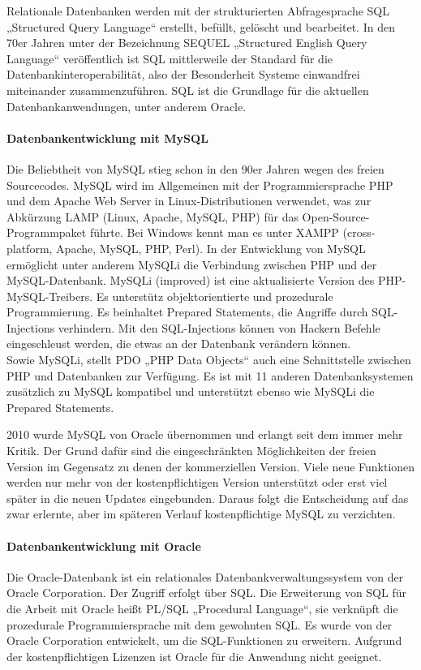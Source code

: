 Relationale Datenbanken werden mit der strukturierten Abfragesprache SQL „Structured Query Language“ erstellt, befüllt, gelöscht und bearbeitet. In den 70er Jahren unter der Bezeichnung SEQUEL „Structured English Query Language“ veröffentlich ist SQL mittlerweile der Standard für die Datenbankinteroperabilität, also der Besonderheit Systeme einwandfrei miteinander zusammenzuführen. SQL ist die Grundlage für die aktuellen Datenbankanwendungen, unter anderem Oracle.

\paragraph{Datenbankentwicklung mit MySQL}

Die Beliebtheit von MySQL\cite{MySQLigegenPDO} stieg schon in den 90er Jahren wegen des freien Sourcecodes. MySQL wird im Allgemeinen mit der Programmiersprache PHP und dem Apache Web Server in Linux-Distributionen verwendet, was zur Abkürzung LAMP (Linux, Apache, MySQL, PHP) für das Open-Source-Programmpaket führte. Bei Windows kennt man es unter XAMPP (cross-platform, Apache, MySQL, PHP, Perl).
In der Entwicklung von MySQL ermöglicht unter anderem MySQLi die Verbindung zwischen PHP und der MySQL-Datenbank. MySQLi (improved) ist eine aktualisierte Version des PHP-MySQL-Treibers. Es unterstütz objektorientierte und prozedurale Programmierung. Es beinhaltet Prepared Statements, die Angriffe durch SQL-Injections verhindern. Mit den SQL-Injections können von Hackern Befehle eingeschleust werden, die etwas an der Datenbank verändern können. \\Sowie MySQLi, stellt PDO „PHP Data Objects“ auch eine Schnittstelle zwischen PHP und Datenbanken zur Verfügung. Es ist mit 11 anderen Datenbanksystemen zusätzlich zu MySQL kompatibel und unterstützt ebenso wie MySQLi die Prepared Statements. 


2010 wurde MySQL von Oracle übernommen und erlangt seit dem immer mehr Kritik. \cite{KritikanderMySQLDatenbank} Der Grund dafür sind die eingeschränkten Möglichkeiten der freien Version im Gegensatz zu denen der kommerziellen Version. Viele neue Funktionen werden nur mehr von der kostenpflichtigen Version unterstützt oder erst viel später in die neuen Updates eingebunden. Daraus folgt die Entscheidung auf das zwar erlernte, aber im späteren Verlauf kostenpflichtige MySQL zu verzichten.

\paragraph{Datenbankentwicklung mit Oracle}
Die Oracle-Datenbank ist ein relationales Datenbankverwaltungssystem von der Oracle Corporation. Der Zugriff erfolgt über SQL. Die Erweiterung von SQL für die Arbeit mit Oracle heißt PL/SQL „Procedural Language“, sie verknüpft die prozedurale Programmiersprache mit dem gewohnten SQL. Es wurde von der Oracle Corporation entwickelt, um die SQL-Funktionen zu erweitern. Aufgrund der kostenpflichtigen Lizenzen ist Oracle für die Anwendung nicht geeignet.

